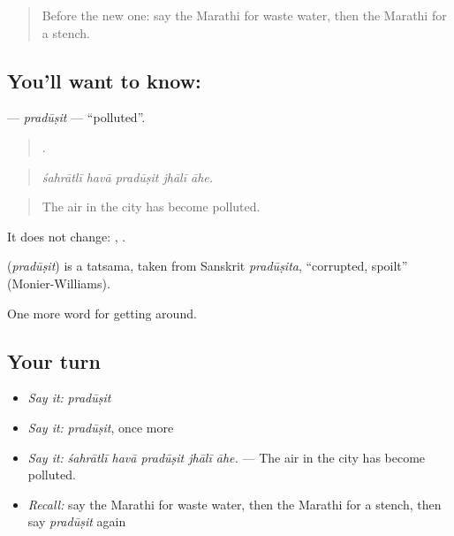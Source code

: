 \label{lesson:MR-C448-pradusit}



\begin{quote}
Before the new one: say the Marathi for waste water, then the Marathi for a stench.
\end{quote}

\subsection*{You'll want to know: }
\textbf{} — \emph{pradūṣit} — \textquotedblleft{}polluted\textquotedblright{}.

\begin{quote}
    .
\end{quote}

\begin{quote}
\emph{śahrātlī havā pradūṣit jhālī āhe.}
\end{quote}

\begin{quote}
The air in the city has become polluted.
\end{quote}

It does not change:  ,  .

\begin{cousinweb}
\textbf{} (\emph{pradūṣit}) is a tatsama, taken from Sanskrit \emph{pradūṣita}, \textquotedblleft{}corrupted, spoilt\textquotedblright{} (Monier-Williams).
\end{cousinweb}

\begin{grammarlens}[title={What you've built}]
One more word for getting around.
\end{grammarlens}

\subsection*{Your turn}
\begin{itemize}
\raggedright
  \item \emph{Say it:} \emph{pradūṣit}
  \item \emph{Say it:} \emph{pradūṣit}, once more
  \item \emph{Say it:} \emph{śahrātlī havā pradūṣit jhālī āhe.} — The air in the city has become polluted.
  \item \emph{Recall:} say the Marathi for waste water, then the Marathi for a stench, then say \emph{pradūṣit} again
\end{itemize}

